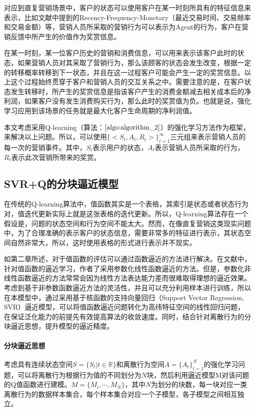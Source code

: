 对应到直复营销场景中，客户的状态可以使用客户在某一时刻所具有的特征信息来表示，比如文献\citep{tkachenko2015autonomous}中提到的Recency-Frequency-Monetary（最近交易时间、交易频率和交易金额）等，营销人员所采取的营销行为可以表示为Agent的行为，客户在营销反馈中所产生的价值作为奖赏信息。

在某一时刻，某一位客户历史的营销和消费信息，可以用来表示该客户此时的状态，如果营销人员对其采取了营销行为，那么该顾客的状态会发生改变，根据一定的转移概率转移到下一状态，并且在这一过程客户可能会产生一定的奖赏信息。以上这个过程始终贯穿于客户和营销人员的交互关系之中。需要注意的是，在客户状态发生转移时，所产生的奖赏信息是指该客户产生的消费金额减去相关成本后的净利润，如果客户没有发生消费购买行为，那么此时的奖赏值为负。也就是说，强化学习应用到该场景的任务就是最大化客户生命周期的净利润值。

本文考虑采用Q-learning（算法：$\ref{algo:algorithm_2}$）的强化学习方法作为框架，来解决以上问题。所以，可以使用$\{<S_{t},A_{t},R_{t}>\}_{t=1}^{\infty}$三元组来表示营销人员的每一次的营销事件。其中，$S_{t}$表示用户的状态，$A_{t}$表示营销人员所采取的行为，$R_{t}$表示此次营销所带来的奖赏。

\subsection{SVR+Q的分块逼近模型}
在传统的Q-learning算法中，值函数其实是一个表格，其索引是状态或者状态行为对，值迭代更新实际上就是这张表格的迭代更新。所以，Q-learning算法存在一个假设是，问题的状态空间和行为空间不能太大。然而，在像直复营销这类现实问题中，为了合理准确的表示客户的状态信息，需要非常多的特征进行表示，其状态空间自然非常大，所以，这时使用表格的形式进行表示并不现实。

如第二章所述，对于值函数的评估可以通过函数逼近的方法进行解决。在文献\citep{pednault2002sequential,archak2010budget,boutilier2016budget}中，针对值函数的逼近学习，作者了采用参数化线性函数逼近的方法。但是，参数化非线性函数逼近的方法常常会因为线性方法表达能力差而很难取得理想的逼近效果。考虑到基于非参数函数逼近方法的灵活性，并且可以充分利用样本进行训练，所以在本模型中，通过采用基于核函数的支持向量回归（Support Vector Regression, SVR）逼近模型，可以将值函数逼近问题转化为高纬特征空间的线性回归问题，在保证泛化能力的前提先有效提高算法的收敛速度。同时，结合针对离散行为的分块逼近思想，提升模型的逼近精度。

\paragraph{分块逼近思想}
考虑具有连续状态空间$S=\{S_{t}|t\in \mathbb{R}\}$和离散行为空间$A=\{A_{t}\}_{t=1}^{N}$的强化学习问题，可以将离散行为根据行为值的不同划分为$N$块，然后利用逼近模型M对该问题的Q值函数进行建模。$M=\{M_{i},\cdots,M_{N}\}$，其中$N$为划分的块数，每一块对应一类离散行为的数据样本集合，每个样本集合对应一个子模型，各子模型之间相互独立。

